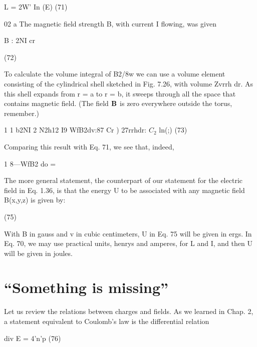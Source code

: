 \begin{equation}
\end{equation}
L = 2W' In (E) (71)

02 a
The magnetic field strength B, with current I flowing, was given

\begin{equation}
\end{equation}
B : 2NI
cr

(72)

To calculate the volume integral of B2/8w we can use a volume element
consisting of the cylindrical shell sketched in Fig. 7.26, with
volume Zvrrh dr. As this shell expands from r = a to r = b, it sweeps
through all the space that contains magnetic field. (The field $\mathbf{B}$ is
zero everywhere outside the torus, remember.)

\begin{equation}
\end{equation}
1 1 b2NI 2 N2h12 I9
WfB2dv:87  Cr ) 27rrhdr: $C_2$ ln(;) (73)

Comparing this result with Eq. 71, we see that, indeed,

\begin{equation}
\end{equation}
1
8---WfB2 do = %

The more general statement, the counterpart of our statement for
the electric field in Eq. 1.36, is that the energy U to be associated with
any magnetic field B(x,y,z) is given by:

\begin{equation}
\end{equation}
(75)

 

With B in gauss and v in cubic centimeters, U in Eq. 75 will be given
in ergs. In Eq. 70, we may use practical units, henrys and amperes,
for L and I, and then U will be given in joules.

\section{``Something is missing''}

Let us review the relations between charges and fields. As we
learned in Chap. 2, a statement equivalent to Coulomb's law is the
differential relation

\begin{equation}
\end{equation}
div E = 4'n'p (76)

